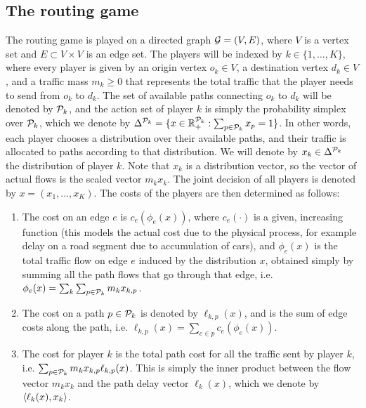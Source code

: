 \documentclass{sig-alternate-ipsn13}
\begin{document}
\subsection{The routing game}
\label{sec:routing_game}
The routing game is played on a directed graph $\mathcal{G} = (V, E)$, where $V$ is a vertex set and $E \subset V \times V$ is an edge set. The players will be indexed by $k \in \{1, \dots, K\}$, where every player is given by an origin vertex $o_k \in V$, a destination vertex $d_k \in V$, and a traffic mass $m_k \geq 0$ that represents the total traffic that the player needs to send from $o_k$ to $d_k$. The set of available paths connecting $o_k$ to $d_k$ will be denoted by $\mathcal{P}_k$, and the action set of player $k$ is simply the probability simplex over $\mathcal{P}_k$, which we denote by $\Delta^{\mathcal{P}_k} = \{x \in \mathbb{R}_+^{\mathcal{P}_k} : \sum_{p \in \mathcal{P}_k} x_p = 1\}$. In other words, each player chooses a distribution over their available paths, and their traffic is allocated to paths according to that distribution. We will denote by $x_k\in \Delta^{\mathcal{P}_k}$ the distribution of player $k$. Note that $x_k$ is a distribution vector, so the vector of actual flows is the scaled vector $m_k x_k$. The joint decision of all players is denoted by $x = (x_1, \dots, x_K)$. The costs of the players are then determined as follows:
\begin{enumerate}[itemsep=0ex,topsep=1ex,label=\alph*)]
\item The cost on an edge $e$ is $c_e(\phi_e(x))$, where $c_e(\cdot)$ is a given, increasing function (this models the actual cost due to the physical process, for example delay on a road segment due to accumulation of cars), and $\phi_e(x)$ is the total traffic flow on edge $e$ induced by the distribution $x$, obtained simply by summing all the path flows that go through that edge, i.e. $\phi_e(x) = \sum_k \sum_{p \in \mathcal{P}_k} m_k x_{k, p}$.
\item The cost on a path $p \in \mathcal{P}_k$ is denoted by $\ell_{k, p}(x)$, and is the sum of edge costs along the path, i.e. $\ell_{k, p}(x) = \sum_{e \in p} c_e(\phi_e(x))$.
\item The cost for player $k$ is the total path cost for all the traffic sent by player $k$, i.e. $\sum_{p \in \mathcal{P}_k} m_k x_{k, p} \ell_{k, p}(x)$. This is simply the inner product between the flow vector $m_k x_k$ and the path delay vector $\ell_k(x)$, which we denote by $\left\langle \ell_k(x), x_k \right\rangle$.
\end{enumerate}
\end{document}
